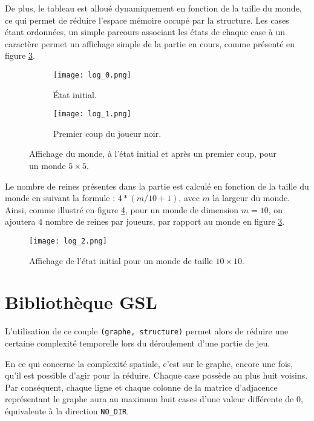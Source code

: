 De plus, le tableau est alloué dynamiquement en fonction de la taille du monde, ce qui permet de réduire l'espace mémoire occupé par la structure. Les cases étant ordonnées, un simple parcours associant les états de chaque case à un caractère permet un affichage simple de la partie en cours, comme présenté en figure \ref{fig:affichage_partie}. 

\medbreak

\begin{figure}[H]
    \centering
    \begin{subfigure}{0.4\textwidth}
        \centering
        \texttt{[image: log\_0.png]}
        \caption{État initial.}
        \label{subfig:affichage_etat_initial}
    \end{subfigure}
    \begin{subfigure}{0.52\textwidth}
        \centering
        \texttt{[image: log\_1.png]}
        \caption{Premier coup du joueur noir.}
        \label{subfig:affichage_premier_coup}
    \end{subfigure}
    \caption{Affichage du monde, à l'état initial et après un premier coup, pour un monde $5\times5$.}
    \label{fig:affichage_partie}
\end{figure}

Le nombre de reines présentes dans la partie est calculé en fonction de la taille du monde en suivant la formule : $4*(m/10 + 1)$, avec $m$ la largeur du monde. Ainsi, comme illustré en figure \ref{fig:affichage_taille_10}, pour un monde de dimension $m=10$, on ajoutera $4$ nombre de reines par joueurs, par rapport au monde en figure \ref{fig:affichage_partie}.

\begin{figure}[H]
    \centering
    \texttt{[image: log\_2.png]}
    \caption{Affichage de l'état initial pour un monde de taille $10\times10$.}
    \label{fig:affichage_taille_10}
\end{figure}

\section{Bibliothèque GSL}
\label{sec:gsl}

L'utilisation de ce couple \texttt{(graphe, structure)} permet alors de réduire une certaine complexité temporelle lors du déroulement d'une partie de jeu. 

En ce qui concerne la complexité spatiale, c'est sur le graphe, encore une fois, qu'il est possible d'agir pour la réduire. Chaque case possède au plus huit voisins. Par conséquent, chaque ligne et chaque colonne de la matrice d'adjacence représentant le graphe aura au maximum huit cases d'une valeur différente de 0, équivalente à la direction \texttt{NO\_DIR}. 

